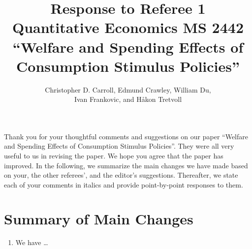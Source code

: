 \documentclass[12pt,letterpaper,english]{article}
\title{\textbf{Response to Referee 1\\ Quantitative Economics MS 2442 \\``Welfare and Spending Effects of \\ Consumption Stimulus Policies''}}
\author{Christopher D. Carroll, Edmund Crawley, William Du, \\ Ivan Frankovic, and H\aa kon Tretvoll}
\date{}
\begin{document}
	\onehalfspacing
	\maketitle
	
\noindent Thank you for your thoughtful comments and suggestions on our paper ``Welfare and Spending Effects of Consumption Stimulus Policies''. They were all very useful to us in revising the paper. We hope you agree that the paper has improved. In the following, we summarize the main changes we have made based on your, the other referees', and the editor's suggestions. Thereafter, we state each of your comments in italics and provide point-by-point responses to them.

\section{Summary of Main Changes}

\begin{enumerate}
	\item We have \ldots 
\end{enumerate}

\newpage 
\end{document}
